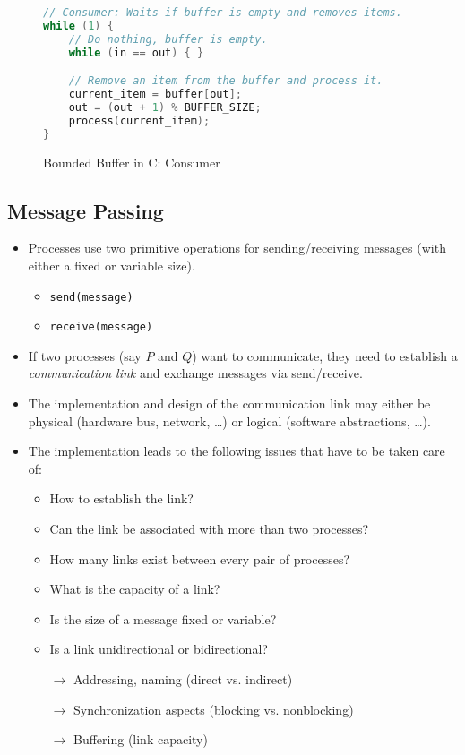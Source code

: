 				\begin{figure}[H]
					\centering
					\begin{lstlisting}[language = C]
// Consumer: Waits if buffer is empty and removes items.
while (1) {
	// Do nothing, buffer is empty.
	while (in == out) { }

	// Remove an item from the buffer and process it.
	current_item = buffer[out];
	out = (out + 1) % BUFFER_SIZE;
	process(current_item);
}
\end{lstlisting}
					\caption{Bounded Buffer in C: Consumer}
				\end{figure}

		\subsection{Message Passing}
			\begin{itemize}
				\item Processes use two primitive operations for sending/receiving messages (with either a fixed or variable size).
					\begin{itemize}
						\item \texttt{send(message)}
						\item \texttt{receive(message)}
					\end{itemize}
				\item If two processes (say \(P\) and \(Q\)) want to communicate, they need to establish a \textit{communication link} and exchange messages via send/receive.
				\item The implementation and design of the communication link may either be physical (hardware bus, network, \dots) or logical (software abstractions, \dots).
				\item The implementation leads to the following issues that have to be taken care of:
					\begin{itemize}
						\item How to establish the link?
						\item Can the link be associated with more than two processes?
						\item How many links exist between every pair of processes?
						\item What is the capacity of a link?
						\item Is the size of a message fixed or variable?
						\item Is a link unidirectional or bidirectional?
						\item[\(\rightarrow\)] Addressing, naming (direct vs. indirect)
						\item[\(\rightarrow\)] Synchronization aspects (blocking vs. nonblocking)
						\item[\(\rightarrow\)] Buffering (link capacity)
					\end{itemize}
			\end{itemize}

